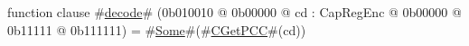 function clause #\hyperref[zdecode]{decode}# (0b010010 @ 0b00000 @ cd : CapRegEnc @    0b00000 @    0b11111 @ 0b111111) = #\hyperref[zSome]{Some}#(#\hyperref[zCGetPCC]{CGetPCC}#(cd))
